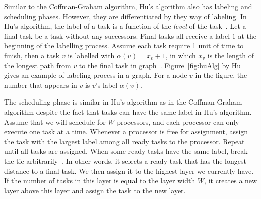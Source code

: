 \documentclass[letterpaper,12pt]{article}
\theoremstyle{definition}
\begin{document}
Similar to the Coffman-Graham algorithm, Hu's algorithm also has labeling and scheduling phases. However, they are differentiated by they way of labeling. In Hu's algorithm, the label of a task is a function of the \textit{level} of the task~\cite{huo_online_2005}. Let a final task be a task without any successors. Final tasks all receive a label $1$ at the beginning of the labelling process. Assume each task require 1 unit of time to finish, then a task $v$ is labelled with $\alpha(v)=x_v + 1$, in which $x_v$ is the length of the longest path from $v$ to the final task in graph~\cite{hu_parallel_1961}. Figure~\ref{fig:huAlg} by Hu gives an example of labeling process in a graph. For a node $v$ in the figure, the number that appears in $v$ is $v$'s label $\alpha(v)$.

The scheduling phase is similar in Hu's algorithm as in the Coffman-Graham algorithm despite the fact that tasks can have the same label in Hu's algorithm. Assume that we will schedule for $W$ processors, and each processor can only execute one task at a time. Whenever a processor is free for assignment, assign the task with the largest label among all ready tasks to the processor. Repeat until all tasks are assigned. When some ready tasks have the same label, break the tie arbitrarily~\cite{leung_basic_2004}. In other words, it selects a ready task that has the longest distance to a final task. We then assign it to the highest layer we currently have. If the number of tasks in this layer is equal to the layer width $W$, it creates a new layer above this layer and assign the task to the new layer. 
\end{document}
